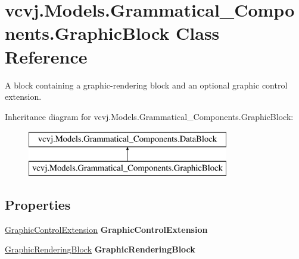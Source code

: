 \hypertarget{classvcvj_1_1_models_1_1_grammatical___components_1_1_graphic_block}{}\section{vcvj.\+Models.\+Grammatical\+\_\+\+Components.\+Graphic\+Block Class Reference}
\label{classvcvj_1_1_models_1_1_grammatical___components_1_1_graphic_block}


A block containing a graphic-\/rendering block and an optional graphic control extension.  


Inheritance diagram for vcvj.\+Models.\+Grammatical\+\_\+\+Components.\+Graphic\+Block\+:\begin{figure}[H]
\begin{center}
\leavevmode
\includegraphics[height=2.000000cm]{classvcvj_1_1_models_1_1_grammatical___components_1_1_graphic_block}
\end{center}
\end{figure}
\subsection*{Properties}
\begin{DoxyCompactItemize}
\item 
\hyperlink{classvcvj_1_1_models_1_1_grammatical___subcomponents_1_1_graphic_control_extension}{Graphic\+Control\+Extension} {\bfseries Graphic\+Control\+Extension}\hypertarget{classvcvj_1_1_models_1_1_grammatical___components_1_1_graphic_block_a4f44785d1058e29dbf194a23ea2ffff2}{}\label{classvcvj_1_1_models_1_1_grammatical___components_1_1_graphic_block_a4f44785d1058e29dbf194a23ea2ffff2}

\item 
\hyperlink{classvcvj_1_1_models_1_1_grammatical___components_1_1_graphic_rendering_block}{Graphic\+Rendering\+Block} {\bfseries Graphic\+Rendering\+Block}\hypertarget{classvcvj_1_1_models_1_1_grammatical___components_1_1_graphic_block_a3b94cc4f51720b0cd37ecb87e8c844e4}{}\label{classvcvj_1_1_models_1_1_grammatical___components_1_1_graphic_block_a3b94cc4f51720b0cd37ecb87e8c844e4}

\end{DoxyCompactItemize}
